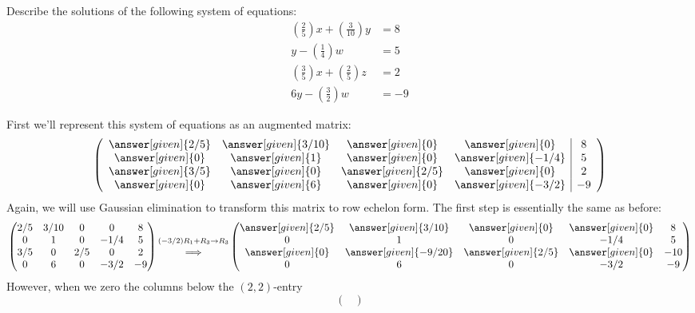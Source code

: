 \documentclass{ximera}
\begin{document}
\begin{example}[No solutions]
  Describe the solutions of the following system of equations:
  \begin{align*}
\left(\frac{2}{5}\right)x + \left(\frac{3}{10}\right) y &= 8\\
y -\left(\frac{1}{4}\right)w &= 5\\
\left(\frac{3}{5}\right)x + \left(\frac{2}{5}\right)z &= 2\\
6y - \left(\frac{3}{2}\right)w &= -9
\end{align*}
\begin{explanation}
First we'll represent this system of equations as an augmented matrix:
  \[
  \left(\begin{array}{cccc|c}
   \answer[given]{2/5}&  \answer[given]{3/10} & \answer[given]{0} &\answer[given]{0} &8 \\
  \answer[given]{0}&  \answer[given]{1} & \answer[given]{0} &\answer[given]{-1/4} & 5\\
  \answer[given]{3/5}&  \answer[given]{0} & \answer[given]{2/5} &\answer[given]{0} &2\\
  \answer[given]{0}&  \answer[given]{6} & \answer[given]{0} &\answer[given]{-3/2} &-9
\end{array}\right)
\]
Again, we will use Gaussian elimination to transform this matrix to
row echelon form. The first step is essentially the same as before:
\[
\begin{pmatrix}
   {2/5}&  {3/10} & {0} &{0} &8 \\
  {0}&  {1} & {0} &{-1/4} & 5\\
  {3/5}&  {0} & {2/5} &{0} &2\\
  {0}&  {6} & {0} &{-3/2} &-9
\end{pmatrix}
\begin{matrix}
  \scriptstyle(-3/2) R_1 + R_3\to R_3\\
  \Longrightarrow
\end{matrix}
\begin{pmatrix}
   \answer[given]{2/5}&  \answer[given]{3/10} & \answer[given]{0} &\answer[given]{0} &8 \\
  {0}&  {1} & {0} &{-1/4} & 5\\
  \answer[given]{0}&  \answer[given]{-9/20} & \answer[given]{2/5} &\answer[given]{0} &-10\\
  {0}&  {6} & {0} &{-3/2} &-9
\end{pmatrix}
\]
However, when we zero the columns below the $(2,2)$-entry
\[
\begin{pmatrix}

\end{pmatrix}\]
\end{explanation}
\end{example}
\end{document}
